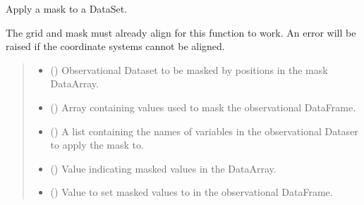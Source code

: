 \documentclass[letterpaper,10pt,english]{sphinxmanual}
\begin{document}

\begin{fulllineitems}
\label{\detokenize{misc:glomar_gridding.mask.mask_dataset}}
\pysigstartsignatures
\pysiglinewithargsret
{}
{\sphinxparamcomma {}\sphinxparamcomma {}\sphinxparamcomma {}\sphinxparamcomma {}}
{}
\pysigstopsignatures
\sphinxAtStartPar
Apply a mask to a DataSet.

\sphinxAtStartPar
The grid and mask must already align for this function to work. An error
will be raised if the coordinate systems cannot be aligned.
\begin{quote}\begin{description}
\begin{itemize}
\item {}
\sphinxAtStartPar
{} () \textendash{} Observational Dataset to be masked by positions in the mask
DataArray.

\item {}
\sphinxAtStartPar
{} () \textendash{} Array containing values used to mask the observational DataFrame.

\item {}
\sphinxAtStartPar
{} () \textendash{} A list containing the names of  variables in the observational Dataser
to apply the mask to.

\item {}
\sphinxAtStartPar
{} () \textendash{} Value indicating masked values in the DataArray.

\item {}
\sphinxAtStartPar
{} () \textendash{} Value to set masked values to in the observational DataFrame.


\end{itemize}
\end{description}
\end{quote}
\end{fulllineitems}
\end{document}
